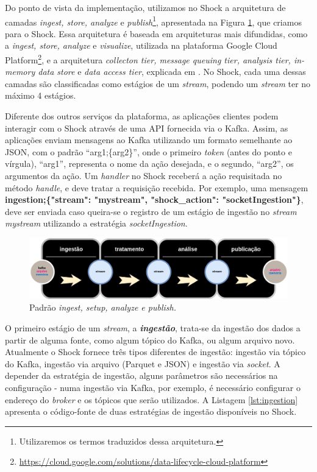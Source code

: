 Do ponto de vista da implementação, utilizamos no Shock a arquitetura de camadas
\textit{ingest, store, analyze} e \textit{publish}\footnote{Utilizaremos os
termos traduzidos dessa arquitetura.}, apresentada na Figura
\ref{fig:ingeststore}, que criamos para o Shock. Essa arquitetura é baseada
em arquiteturas mais difundidas, como a \textit{ingest, store, analyze} e
\textit{visualize}, utilizada na plataforma Google Cloud
Platform\footnote{\url{https://cloud.google.com/solutions/data-lifecycle-cloud-platform}},
e a arquitetura \textit{collecton tier, message queuing tier, analysis tier,
in-memory data store} e \textit{data access tier}, explicada em
. No Shock, cada uma dessas camadas são
classificadas como estágios de um \textit{stream}, podendo um
\textit{stream} ter no máximo 4 estágios.

Diferente dos outros serviços da plataforma, as aplicações clientes podem interagir
com o Shock através de uma API fornecida via o Kafka. Assim, as aplicações enviam
mensagens ao Kafka utilizando um formato semelhante ao JSON, com o padrão ``arg1;\{arg2\}'',
onde o primeiro \textit{token} (antes do ponto e vírgula), ``arg1'', representa o nome
da ação desejada, e o segundo, ``arg2'', os argumentos da ação. Um
\textit{handler} no Shock receberá a ação requisitada no método
\textit{handle}, e deve tratar a requisição recebida. Por exemplo, uma mensagem
\small{\textbf{ingestion;\{"stream": "mystream", "shock\_action": "socketIngestion"\}}},
deve ser enviada caso queira-se o registro de um estágio de ingestão no
\textit{stream} \textit{mystream} utilizando a estratégia \textit{socketIngestion}.

\begin{figure}
  \centering
  \includegraphics[width=\textwidth]{figuras/arquiteturaforensic.png}
  \caption{Padrão \textit{ingest, setup, analyze e publish.}}
  \label{fig:ingeststore}
\end{figure}

O primeiro estágio de um \textit{stream}, a \textit{\textbf{ingestão}}, trata-se da
ingestão dos dados a partir de alguma fonte, como algum tópico do Kafka, ou
algum arquivo novo. Atualmente o Shock fornece três tipos diferentes de
ingestão: ingestão via tópico do Kafka, ingestão via arquivo (Parquet e JSON)
e ingestão via \textit{socket}. A depender da estratégia de ingestão, alguns
parâmetros são necessários na configuração - numa ingestão via Kafka, por
exemplo, é necessário configurar o endereço do \textit{broker} e os tópicos
que serão utilizados. A Listagem \ref{lst:ingestion} apresenta o código-fonte
de duas estratégias de ingestão disponíveis no Shock.

